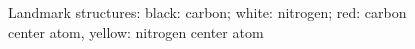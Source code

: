 \begin{figure}[p]
\center
{}


\caption{Landmark structures: black: carbon; white: nitrogen; red: carbon center atom, yellow: nitrogen center atom}
\label{fig:landmarks2}

\end{figure}

